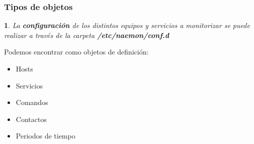 \documentclass{beamer}
\theoremstyle{plain}
\theoremstyle{definition}
\theoremstyle{plain}
\newtheorem{prop}[thm]{}
\theoremstyle{definition}
\theoremstyle{remark}
\theoremstyle{definition}
\begin{document}
\begin{frame}
	\frametitle{Tipos de objetos}
	\begin{prop}
		La \textbf{configuración} de los distintos equipos y servicios a monitorizar se puede realizar a través de la carpeta \textbf{/etc/naemon/conf.d}
	\end{prop}
Podemos encontrar como objetos de definición:
\begin{itemize}
	\item Hosts
	\item Servicios
	\item Comandos
	\item Contactos
	\item Periodos de tiempo
\end{itemize}
	
\end{frame}
\end{document}
